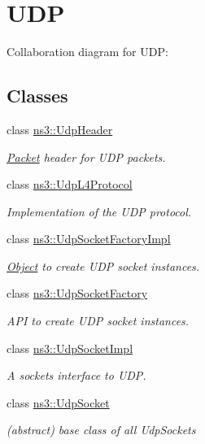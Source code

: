 \hypertarget{group__udp}{}\section{U\+DP}
\label{group__udp}
Collaboration diagram for U\+DP\+:
\subsection*{Classes}
\begin{DoxyCompactItemize}
\item 
class \hyperlink{classns3_1_1UdpHeader}{ns3\+::\+Udp\+Header}
\begin{DoxyCompactList}\small\item\em \hyperlink{classns3_1_1Packet}{Packet} header for U\+DP packets. \end{DoxyCompactList}\item 
class \hyperlink{classns3_1_1UdpL4Protocol}{ns3\+::\+Udp\+L4\+Protocol}
\begin{DoxyCompactList}\small\item\em Implementation of the U\+DP protocol. \end{DoxyCompactList}\item 
class \hyperlink{classns3_1_1UdpSocketFactoryImpl}{ns3\+::\+Udp\+Socket\+Factory\+Impl}
\begin{DoxyCompactList}\small\item\em \hyperlink{classns3_1_1Object}{Object} to create U\+DP socket instances. \end{DoxyCompactList}\item 
class \hyperlink{classns3_1_1UdpSocketFactory}{ns3\+::\+Udp\+Socket\+Factory}
\begin{DoxyCompactList}\small\item\em A\+PI to create U\+DP socket instances. \end{DoxyCompactList}\item 
class \hyperlink{classns3_1_1UdpSocketImpl}{ns3\+::\+Udp\+Socket\+Impl}
\begin{DoxyCompactList}\small\item\em A sockets interface to U\+DP. \end{DoxyCompactList}\item 
class \hyperlink{classns3_1_1UdpSocket}{ns3\+::\+Udp\+Socket}
\begin{DoxyCompactList}\small\item\em (abstract) base class of all Udp\+Sockets \end{DoxyCompactList}\end{DoxyCompactItemize}


